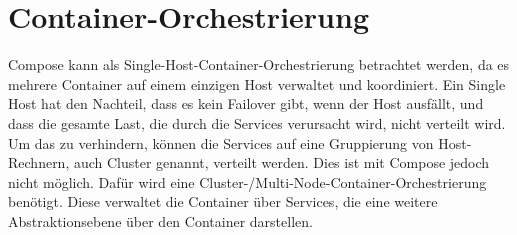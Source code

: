 \section{Container-Orchestrierung}
Compose kann als Single-Host-Container-Orchestrierung betrachtet werden, da es mehrere Container auf einem einzigen Host verwaltet und koordiniert.
Ein Single Host hat den Nachteil, dass es kein Failover gibt, wenn der Host ausfällt, und dass die gesamte Last, die durch die Services verursacht wird, nicht verteilt wird.
Um das zu verhindern, können die Services auf eine Gruppierung von Host-Rechnern, auch Cluster genannt, verteilt werden. Dies ist mit Compose jedoch nicht möglich.
Dafür wird eine Cluster-/Multi-Node-Container-Orchestrierung benötigt. Diese verwaltet die Container über Services, die eine weitere Abstraktionsebene über den Container darstellen.



